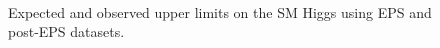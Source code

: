 \begin{figure}[!hbtp]
\\

\caption{Expected and observed upper limits on the SM Higgs using EPS and post-EPS datasets.}
\label{fig:uls_eps}
\end{figure}

